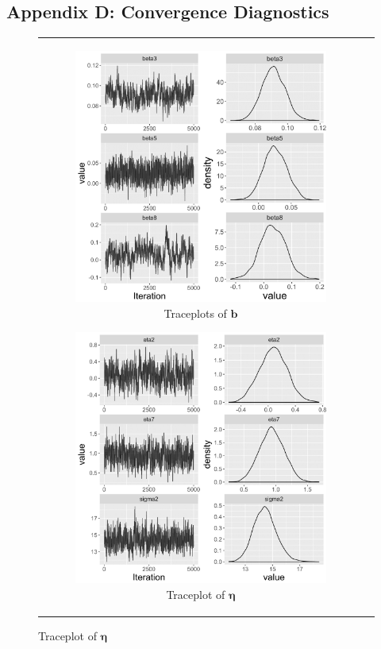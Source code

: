 \documentclass[ba]{imsart}
\numberwithin{equation}{section}
\theoremstyle{plain}
\begin{document}
	\subsection*{Appendix D: Convergence Diagnostics}\label{appendix: convergence}
		\begin{figure}[H]
			\centering
			\begin{tabular}[t]{cc}
				\begin{subfigure}[b]{0.495\textwidth}
					\caption{Traceplots of $\boldsymbol{b}$}
					\includegraphics[width=\textwidth]{img/betatrace-1.png}	
				\end{subfigure}
				\begin{subfigure}[b]{0.495\textwidth}
					\caption{Traceplot of $\boldsymbol{\eta}$}
					\includegraphics[width=\textwidth]{img/etatrace-1.png}	

\end{subfigure}
\end{tabular}
\end{figure}
\end{document}
